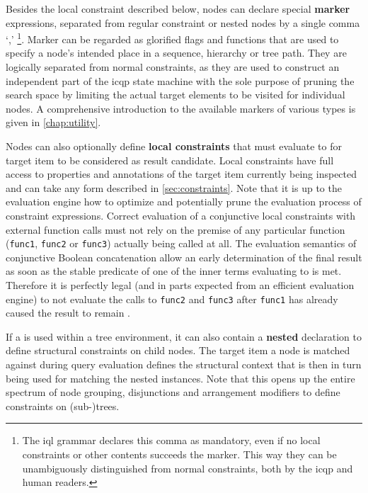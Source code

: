 \documentclass[11pt,a4paper]{report}
\begin{document}
Besides the local constraint described below, nodes can declare special \textbf{marker} expressions, separated from regular constraint or nested nodes by a single comma `,' \footnote{The \ac{iql} grammar declares this comma as mandatory, even if no local constraints or other contents succeeds the marker. This way they can be unambiguously distinguished from normal constraints, both by the \ac{icqp} and human readers.}.
Marker can be regarded as glorified flags and functions that are used to specify a node's intended place in a sequence, hierarchy or tree path.
They are logically separated from normal constraints, as they are used to construct an independent part of the \ac{icqp} state machine with the sole purpose of pruning the search space by limiting the actual target elements to be visited for individual nodes.
A comprehensive introduction to the available markers of various types is given in \cref{chap:utility}. 

Nodes can also optionally define \textbf{local constraints} that must evaluate to  for target item to be considered as result candidate.
Local constraints have full access to properties and annotations of the target item currently being inspected and can take any form described in \cref{sec:constraints}.
Note that it is up to the evaluation engine how to optimize and potentially prune the evaluation process of constraint expressions.
Correct evaluation of a conjunctive local constraints with external function calls  must not rely on the premise of any particular function (\texttt{func1}, \texttt{func2} or \texttt{func3}) actually being called at all.
The evaluation semantics of conjunctive Boolean concatenation allow an early determination of the final result as soon as the stable predicate of one of the inner terms evaluating to  is met.
Therefore it is perfectly legal (and in parts expected from an efficient evaluation engine) to not evaluate the calls to \texttt{func2} and \texttt{func3} after \texttt{func1} has already caused the result to remain .

If a  is used within a tree environment, it can also contain a \textbf{nested}  declaration to define structural constraints on child nodes.
The target item a node is matched against during query evaluation defines the structural context that is then in turn being used for matching the nested  instances.
Note that this opens up the entire spectrum of node grouping, disjunctions and arrangement modifiers to define constraints on (sub-)trees.
\end{document}
